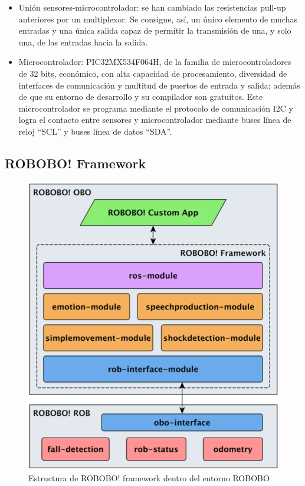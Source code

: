 \begin{itemize}
\begin{itemize}
	\end{itemize}
	\item Unión sensores-microcontrolador: se han cambiado las resistencias pull-up anteriores por un multiplexor. Se consigue, así, un único elemento de muchas entradas y una única salida capaz de permitir la transmisión de una, y solo una, de las entradas hacia la salida.

	\item Microcontrolador: PIC32MX534F064H, de la familia de microcontroladores de 32 bits, económico, con alta capacidad de procesamiento, diversidad de interfaces de comunicación y multitud de puertos de entrada y salida; además de que su entorno de desarrollo y su compilador son gratuitos. Este microcontrolador se programa mediante el protocolo de comunicación I2C y logra el contacto entre sensores y microcontrolador mediante buses línea de reloj “SCL” y buses línea de datos “SDA”.




\end{itemize}




\subsection{ROBOBO! Framework}

\begin{figure}
	\centering
	\includegraphics[width=0.6\linewidth]{imagenes/robobo_framework.png}
	\caption{Estructura de ROBOBO! framework dentro del entorno ROBOBO}
	\label{fig:robobo_framework_estructure}
\end{figure}

